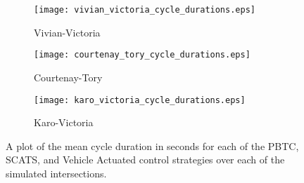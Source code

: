 \begin{figure}
\centering
\begin{subfigure}{.5\textwidth}
  \centering
  \texttt{[image: vivian\_victoria\_cycle\_durations.eps]}
  \caption{Vivian-Victoria}
  \label{cycle_durations:sub1}
\end{subfigure}%
\begin{subfigure}{.5\textwidth}
  \centering
  \texttt{[image: courtenay\_tory\_cycle\_durations.eps]}
  \caption{Courtenay-Tory}
  \label{cycle_durations:sub2}
\end{subfigure}

\vspace{1cm}

\begin{subfigure}{.5\textwidth}
  \centering
  \texttt{[image: karo\_victoria\_cycle\_durations.eps]}
  \caption{Karo-Victoria}
  \label{cycle_durations:sub3}
\end{subfigure}%
\caption{ A plot of the mean cycle duration in seconds for each of the PBTC, SCATS, and Vehicle Actuated control strategies over each of the simulated intersections.   }
\label{eval:cycle_durations}
\end{figure}




